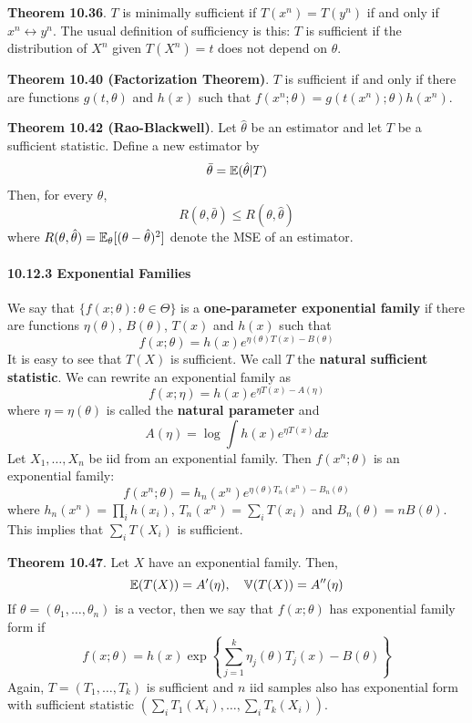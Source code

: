 \textbf{Theorem 10.36}. \(T\) is minimally sufficient if
\(T(x^{n}) = T(y^{n})\) if and only if \(x^{n} \leftrightarrow y^{n}\).
The usual definition of sufficiency is this: \(T\) is sufficient if the
distribution of \(X^{n}\) given \(T(X^{n}) = t\) does not depend on
\(\theta\).

\textbf{Theorem 10.40 (Factorization Theorem)}. \(T\) is sufficient if
and only if there are functions \(g(t, \theta)\) and \(h(x)\) such that
\(f(x^{n}; \theta) = g(t(x^{n}); \theta)h(x^{n})\).

\textbf{Theorem 10.42 (Rao-Blackwell)}. Let \(\hat{\theta}\) be an
estimator and let \(T\) be a sufficient statistic. Define a new
estimator by
\[
\bar{\theta} = \operatorname{\mathbb{E}}(\hat{\theta} | T)
\]
Then, for every \(\theta\),
\[
R(\theta, \bar{\theta}) \leq R(\theta, \hat{\theta})
\]
where
\(R(\theta, \hat{\theta}) = \operatorname{\mathbb{E}}_{\theta}[(\theta - \hat{\theta})^{2}]\)
denote the MSE of an estimator.
\paragraph{10.12.3 Exponential Families}\label{exponential-families}
We say that \(\{f(x; \theta) : \theta \in \Theta\}\) is a
\textbf{one-parameter exponential family} if there are functions
\(\eta(\theta)\), \(B(\theta)\), \(T(x)\) and \(h(x)\) such that
\[
f(x; \theta) = h(x) e^{\eta(\theta)T(x) - B(\theta)}
\]
It is easy to see that \(T(X)\) is sufficient. We call \(T\) the
\textbf{natural sufficient statistic}.
We can rewrite an exponential family as
\[
f(x; \eta) = h(x) e^{\eta T(x) - A(\eta)}
\]
where \(\eta = \eta(\theta)\) is called the \textbf{natural parameter}
and
\[
A(\eta) = \log \int h(x) e^{\eta T(x)} dx
\]
Let \(X_{1}, \dots, X_{n}\) be iid from an exponential family. Then
\(f(x^{n}; \theta)\) is an exponential family:
\[
f(x^{n}; \theta) = h_{n}(x^{n}) e^{\eta(\theta) T_{n}(x^{n}) - B_{n}(\theta)}
\]
where \(h_{n}(x^{n}) = \prod_{i} h(x_{i})\), \(T_{n}(x^{n}) = \sum_{i} T(x_{i})\) and
\(B_{n}(\theta) = nB(\theta)\). This implies that \(\sum_{i} T(X_{i})\) is
sufficient.

\textbf{Theorem 10.47}. Let \(X\) have an exponential family. Then,
\[
\operatorname{\mathbb{E}}(T(X)) = A'(\eta),
\quad
\operatorname{\mathbb{V}}(T(X)) = A''(\eta)
\]
If \(\theta = (\theta_{1}, \dots, \theta_{n})\) is a vector, then we say
that \(f(x; \theta)\) has exponential family form if
\[
f(x; \theta) = h(x) \exp \left\{ \sum_{j=1}^{k} \eta_{j}(\theta) T_{j}(x) - B(\theta) \right\}
\]
Again, \(T = (T_{1}, \dots, T_{k})\) is sufficient and \(n\) iid samples
also has exponential form with sufficient statistic
\(\left(\sum_{i} T_{1}(X_{i}), \dots, \sum_{i} T_{k}(X_{i})\right)\).
